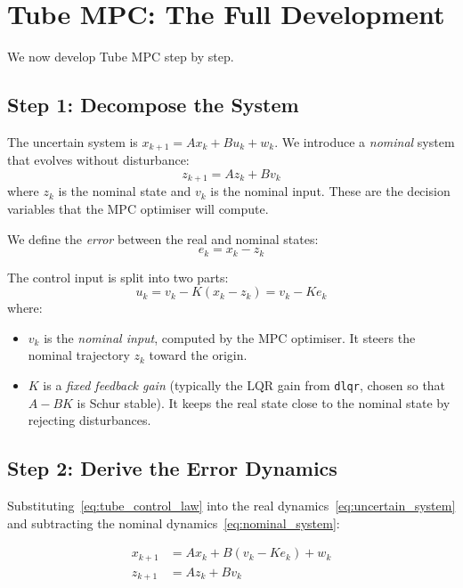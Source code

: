 \section{Tube MPC: The Full Development}
\label{sec:tube_full}

We now develop Tube MPC step by step.

\subsection{Step 1: Decompose the System}

The uncertain system is $x_{k+1} = Ax_k + Bu_k + w_k$. We introduce a \emph{nominal} system that evolves without disturbance:
\begin{equation} \label{eq:nominal_system}
	z_{k+1} = Az_k + Bv_k
\end{equation}
where $z_k$ is the nominal state and $v_k$ is the nominal input. These are the decision variables that the MPC optimiser will compute.

We define the \emph{error} between the real and nominal states:
\[
e_k = x_k - z_k
\]

The control input is split into two parts:
\begin{equation} \label{eq:tube_control_law}
	u_k = v_k - K(x_k - z_k) = v_k - Ke_k
\end{equation}
where:
\begin{itemize}[noitemsep]
	\item $v_k$ is the \emph{nominal input}, computed by the MPC optimiser. It steers the nominal trajectory $z_k$ toward the origin.
	\item $K$ is a \emph{fixed feedback gain} (typically the LQR gain from \texttt{dlqr}, chosen so that $A - BK$ is Schur stable). It keeps the real state close to the nominal state by rejecting disturbances.
\end{itemize}

\subsection{Step 2: Derive the Error Dynamics}

Substituting~\eqref{eq:tube_control_law} into the real dynamics~\eqref{eq:uncertain_system} and subtracting the nominal dynamics~\eqref{eq:nominal_system}:

\begin{align*}
	x_{k+1} &= Ax_k + B(v_k - Ke_k) + w_k \\
	z_{k+1} &= Az_k + Bv_k
\end{align*}


